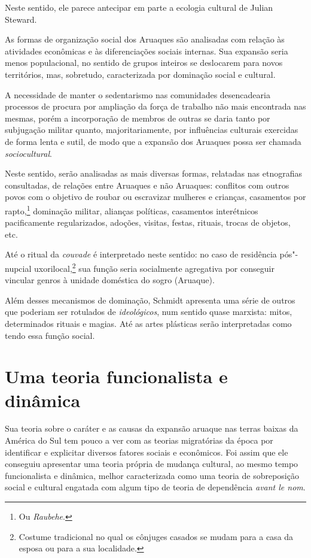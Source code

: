 Neste sentido, ele parece antecipar em parte a
ecologia cultural de Julian Steward.

As formas de organização social dos Aruaques são analisadas com relação às atividades econômicas e às diferenciações sociais internas. Sua expansão seria menos populacional, no sentido de grupos inteiros se deslocarem para novos territórios, mas, sobretudo, caracterizada por dominação social e cultural. 

A necessidade de manter o sedentarismo nas comunidades desencadearia processos de procura por ampliação da força de trabalho não mais encontrada nas mesmas, porém a incorporação de membros de outras se daria tanto por subjugação militar quanto, majoritariamente, por influências culturais exercidas de forma lenta e sutil, de modo que a expansão dos Aruaques possa ser chamada \textit{sociocultural}. 

Neste sentido, serão analisadas as mais diversas formas, relatadas nas etnografias consultadas, de relações entre Aruaques e não Aruaques: conflitos com outros povos com o objetivo de roubar ou escravizar mulheres e crianças, casamentos por rapto,\footnote{Ou \textit{Raubehe}.} dominação militar, alianças políticas, casamentos interétnicos pacificamente regularizados, adoções, visitas, festas, rituais, trocas de objetos, etc. 

Até o ritual da \textit{couvade} é interpretado neste sentido: no caso de residência pós"-nupcial uxorilocal,\footnote{Costume tradicional no qual os cônjuges casados se mudam para a casa da esposa ou para a sua localidade.} sua função seria socialmente agregativa por conseguir vincular genros à unidade doméstica do sogro (Aruaque).

Além desses mecanismos de dominação, Schmidt apresenta uma série de outros que poderiam ser rotulados de \textit{ideológicos}, num sentido quase marxista: mitos, determinados rituais e magias. Até as artes plásticas serão interpretadas como tendo essa função social.

\section{Uma teoria funcionalista e dinâmica}

Sua teoria sobre o caráter e as causas da expansão aruaque nas terras baixas da América do Sul tem pouco a ver com as teorias migratórias da época por identificar e explicitar diversos fatores sociais e econômicos. Foi assim que ele conseguiu apresentar uma teoria própria de mudança cultural, ao mesmo tempo funcionalista e dinâmica, melhor caracterizada como uma teoria de sobreposição social e cultural engatada com algum tipo de teoria de dependência \textit{avant le nom}. 

